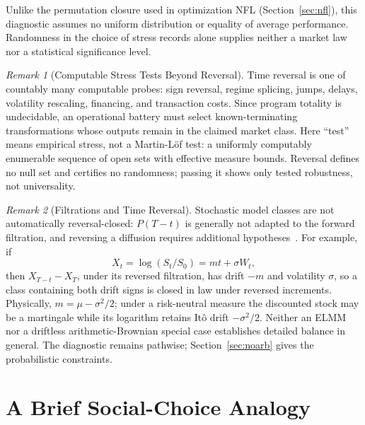 \documentclass[aps,pra,reprint,superscriptaddress,amsmath,amssymb,floatfix]{revtex4-2}
\theoremstyle{plain}
\theoremstyle{definition}
\theoremstyle{remark}
\newtheorem{remark}{Remark}
\begin{document}
Unlike the permutation closure used in optimization NFL
(Section~\ref{sec:nfl}), this diagnostic assumes no uniform distribution or
equality of average performance. Randomness in the choice of stress records
alone supplies neither a market law nor a statistical significance level.

\begin{remark}[Computable Stress Tests Beyond Reversal]
\label{rem:stressfamily}
Time reversal is one of countably many computable probes: sign reversal,
regime splicing, jumps, delays, volatility rescaling, financing, and transaction
costs. Since program totality is undecidable, an operational battery must select
known-terminating transformations whose outputs remain in the claimed market
class. Here ``test'' means empirical stress, not a Martin-L\"of test: a uniformly
computably enumerable sequence of open sets with effective measure bounds.
Reversal defines no null set and certifies no randomness; passing it shows only
tested robustness, not universality.
\end{remark}

\begin{remark}[Filtrations and Time Reversal]
Stochastic model classes are not automatically reversal-closed:
\(P(T-t)\) is generally not adapted to the forward filtration, and reversing a
diffusion requires additional hypotheses~\cite{HaussmannPardoux1986}. For
example, if
\[
  X_t=\log(S_t/S_0)=mt+\sigma W_t,
\]
then \(X_{T-t}-X_T\), under its reversed filtration, has drift \(-m\) and
volatility \(\sigma\), so a class containing both drift signs is closed in law
under reversed increments. Physically, \(m=\mu-\sigma^2/2\); under a
risk-neutral measure the discounted stock may be a martingale while its
logarithm retains It\^o drift \(-\sigma^2/2\). Neither an ELMM nor a driftless
arithmetic-Brownian special case establishes detailed balance in general. The
diagnostic remains pathwise; Section~\ref{sec:noarb} gives the probabilistic
constraints.
\end{remark}

\section{A Brief Social-Choice Analogy}
\label{sec:arrow}
\end{document}
